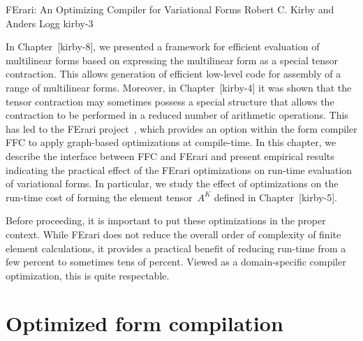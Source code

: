              {FErari: An Optimizing Compiler for Variational Forms}
              {Robert C. Kirby and Anders Logg}
              {kirby-3}

In Chapter~[kirby-8], we presented a framework for efficient
evaluation of multilinear forms based on expressing the multilinear
form as a special tensor contraction. This allows generation of
efficient low-level code for assembly of a range of multilinear
forms. Moreover, in Chapter~[kirby-4] it was shown that the tensor
contraction may sometimes possess a special structure that allows the
contraction to be performed in a reduced number of arithmetic
operations. This has led to the FErari
project~\cite{KirbyKnepleyEtAl2005,KirbyLoggEtAl2006,KirbyScott2007,KirbyLogg2008}, which provides
an option within the form compiler FFC to apply graph-based
optimizations at compile-time. In this chapter, we describe the
interface between FFC and FErari and present empirical results
indicating the practical effect of the FErari optimizations on
run-time evaluation of variational forms. In particular, we study the
effect of optimizations on the run-time cost of forming the element
tensor~$A^K$ defined in Chapter~[kirby-5].

Before proceeding, it is important to put these optimizations in the
proper context. While FErari does not reduce the overall order of
complexity of finite element calculations, it provides a practical
benefit of reducing run-time from a few percent to sometimes tens of
percent. Viewed as a domain-specific compiler optimization, this is
quite respectable.

\section{Optimized form compilation}

